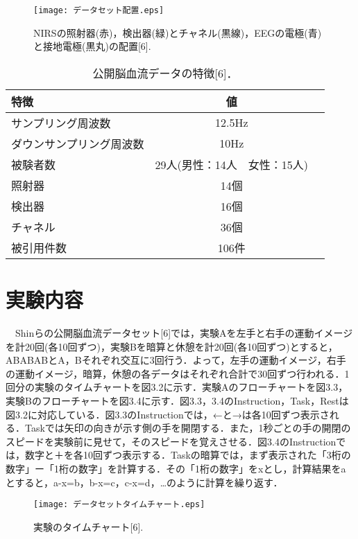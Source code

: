 \documentclass[a4j,12pt]{jreport}
\begin{document}
\begin{figure}[t]
  \begin{center}
    \texttt{[image: データセット配置.eps]}
    \caption{NIRSの照射器(赤)，検出器(緑)とチャネル(黒線)，EEGの電極(青)と接地電極(黒丸)の配置[6].}
    \label{fig}
  \end{center}
\end{figure}

\begin{table}[hbtp]
  \caption{公開脳血流データの特徴[6]．}
  \label{table:data_type}
  \centering
  \begin{tabular}{lcr}
    \hline
    特徴  & 値  \\
    \hline \hline
    サンプリング周波数  & 12.5Hz \\
    ダウンサンプリング周波数  & 10Hz \\
    被験者数  & 29人(男性：14人　女性：15人) \\
    照射器  & 14個 \\
    検出器  & 16個\\
    チャネル  & 36個\\
    被引用件数  & 106件\\
    \hline
  \end{tabular}
\end{table}

\section{実験内容}
　Shinらの公開脳血流データセット[6]では，実験Aを左手と右手の運動イメージを計20回(各10回ずつ)，実験Bを暗算と休憩を計20回(各10回ずつ)とすると，ABABABとA，Bそれぞれ交互に3回行う．よって，左手の運動イメージ，右手の運動イメージ，暗算，休憩の各データはそれぞれ合計で30回ずつ行われる．1回分の実験のタイムチャートを図3.2に示す．実験Aのフローチャートを図3.3，実験Bのフローチャートを図3.4に示す．図3.3，3.4のInstruction，Task，Restは図3.2に対応している．図3.3のInstructionでは，←と→は各10回ずつ表示される．Taskでは矢印の向きが示す側の手を開閉する．また，1秒ごとの手の開閉のスピードを実験前に見せて，そのスピードを覚えさせる．図3.4のInstructionでは，数字と＋を各10回ずつ表示する．Taskの暗算では，まず表示された「3桁の数字」ー「1桁の数字」を計算する．その「1桁の数字」をxとし，計算結果をaとすると，a-x=b，b-x=c，c-x=d，…のように計算を繰り返す．\\

\begin{figure}[t]
  \begin{center}
    \texttt{[image: データセットタイムチャート.eps]}
    \caption{実験のタイムチャート[6].}
    \label{fig}
  \end{center}
\end{figure}
\end{document}
